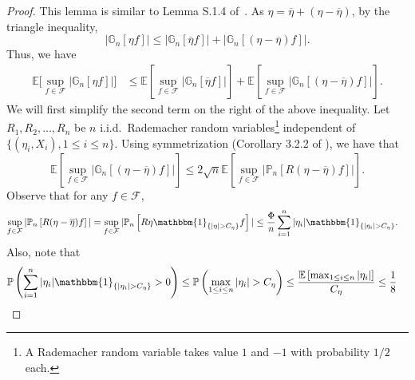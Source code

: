\begin{proof}
This lemma is similar to Lemma S.1.4 of~\cite{kuchibhotla2018moving}. As $\eta = \overline{\eta} + (\eta - \overline{\eta})$, by the triangle inequality,
\begin{equation*}
|\mathbb{G}_n[\eta f]| \le |\mathbb{G}_n[\overline{\eta} f]| + |\mathbb{G}_n[(\eta - \overline{\eta})f]|.
\end{equation*}
Thus, we have 
\begin{align}\label{eq:FirstIneqHJ}
\mathbb{E}\big[\sup_{f\in\mathcal{F}}|\mathbb{G}_n[\eta f]|\big]&\le \mathbb{E}\left[\sup_{f\in\mathcal{F}}|\mathbb{G}_n[\overline\eta f]|\right] +\mathbb{E}\left[\sup_{f\in\mathcal{F}}|\mathbb{G}_n[(\eta -\overline{\eta})f]|\right].
\end{align}
We will first simplify the second term on the right of the above inequality. Let $R_1, R_2, \ldots, R_n$ be $n$ i.i.d.~Rademacher random variables\footnote{A Rademacher random variable takes value $1$ and $-1$ with probability $1/2$ each.} independent of $\{(\eta_i, X_i), 1\le i\le n\}$. 
Using symmetrization  (Corollary 3.2.2 of \cite{Gine16}), we have that \[
  \mathbb{E}\left[\sup_{f\in\mathcal{F}}|\mathbb{G}_n[(\eta -\overline{\eta})f]|\right] \le  2 \sqrt{n} \mathbb{E}\left[\sup_{f\in\mathcal{F}}|\mathbb{P}_n[R(\eta -\overline{\eta})f]|\right].
\]
Observe that for any $f\in\mathcal{F}$,
\begin{align}\label{eq:FirstBoundHJ}
\sup_{f\in\mathcal{F}} |\mathbb{P}_n\left[R(\eta - \overline{\eta})f\right]| &= \sup_{f\in\mathcal{F}} |\mathbb{P}_n\left[R\eta\mathbbm{1}_{\{|\eta| > C_{\eta}\}}f\right]| \le \frac{\Phi}{n}\sum_{i=1}^n |\eta_i|\mathbbm{1}_{\{|\eta_i| > C_{\eta}\}}.
\end{align}
Also, note that
\begin{align*}
\mathbb{P}\left(\sum_{i=1}^n |\eta_i|\mathbbm{1}_{\{|\eta_i| > C_{\eta}\}} > 0\right)
&\le \mathbb{P}\left(\max_{1\le i\le n}|\eta_i| > C_{\eta}\right) \le \frac{\mathbb{E}\left[\max_{1\le i\le n}|\eta_i|\right]}{C_{\eta}}\le \frac{1}{8}
\end{align*}

\end{proof}
